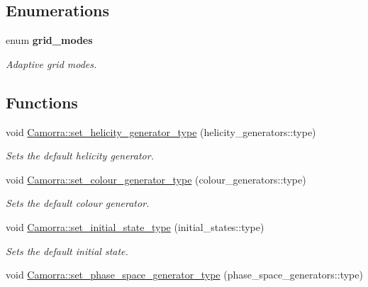 \subsection*{Enumerations}
\begin{DoxyCompactItemize}
\item 
enum {\bfseries grid\_\-modes} 
\begin{DoxyCompactList}\small\item\em Adaptive grid modes. \end{DoxyCompactList}\end{DoxyCompactItemize}
\subsection*{Functions}
\begin{DoxyCompactItemize}
\item 
\hypertarget{a00798_a434afc4df475b015efdcf5a266c2698e}{
void \hyperlink{a00798_a434afc4df475b015efdcf5a266c2698e}{Camorra::set\_\-helicity\_\-generator\_\-type} (helicity\_\-generators::type)}
\label{a00798_a434afc4df475b015efdcf5a266c2698e}

\begin{DoxyCompactList}\small\item\em Sets the default helicity generator. \end{DoxyCompactList}\item 
\hypertarget{a00798_ad71a6538e255e41a537f0e34740f51ac}{
void \hyperlink{a00798_ad71a6538e255e41a537f0e34740f51ac}{Camorra::set\_\-colour\_\-generator\_\-type} (colour\_\-generators::type)}
\label{a00798_ad71a6538e255e41a537f0e34740f51ac}

\begin{DoxyCompactList}\small\item\em Sets the default colour generator. \end{DoxyCompactList}\item 
\hypertarget{a00798_ae4e428854913f1ce28404e339ba590e8}{
void \hyperlink{a00798_ae4e428854913f1ce28404e339ba590e8}{Camorra::set\_\-initial\_\-state\_\-type} (initial\_\-states::type)}
\label{a00798_ae4e428854913f1ce28404e339ba590e8}

\begin{DoxyCompactList}\small\item\em Sets the default initial state. \end{DoxyCompactList}\item 
\hypertarget{a00798_ad8899b9b08426e00640888dffbcefbb1}{
void \hyperlink{a00798_ad8899b9b08426e00640888dffbcefbb1}{Camorra::set\_\-phase\_\-space\_\-generator\_\-type} (phase\_\-space\_\-generators::type)}
\label{a00798_ad8899b9b08426e00640888dffbcefbb1}


\end{DoxyCompactItemize}
